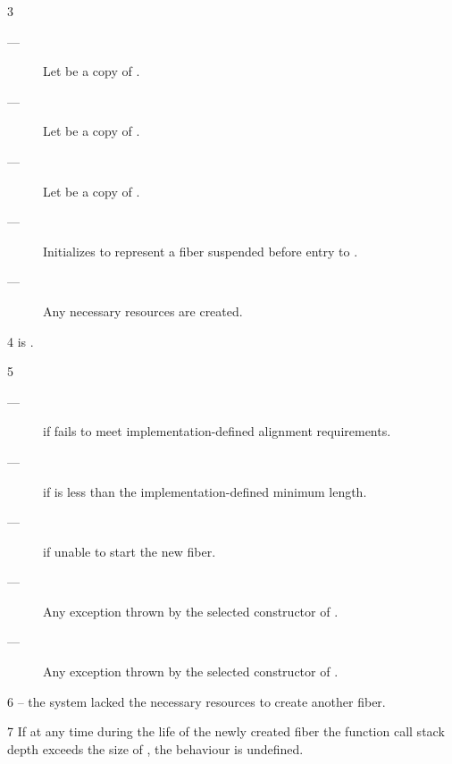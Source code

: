 3 \effects
\begin{description}
    \item[---] Let  be a copy of .
    \item[---] Let  be a copy of .
    \item[---] Let  be a copy of .
    \item[---] Initializes  to represent a fiber suspended before
              entry to .
    \item[---] Any necessary resources are created.
\end{description}

4 \postcond
\emptyfn is \false.

5 \except
\begin{description}
    \item[---]  if  fails to meet
               implementation-defined alignment requirements.
    \item[---]  if  is less than the
               implementation-defined minimum length.
    \item[---]  if unable to start the new fiber.
    \item[---] Any exception thrown by the selected constructor of .
    \item[---] Any exception thrown by the selected constructor of .
\end{description}

6 \errors
{} -- the system lacked the necessary resources to create another fiber.

7 \remarks
If at any time during the life of the newly created fiber the
function call stack depth exceeds the size of , the behaviour is
undefined.


